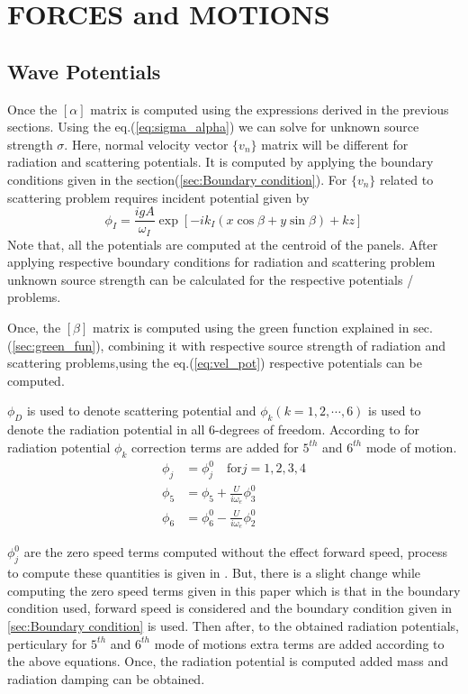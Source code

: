 \chapter{FORCES and MOTIONS}
\section{Wave Potentials}
Once the $[\alpha]$ matrix is computed using the expressions derived in the previous sections. Using
the eq.(\ref{eq:sigma_alpha}) we can solve for unknown source strength $\sigma$. Here, normal velocity
vector $\{v_n\}$ matrix will be different for radiation and scattering potentials. It is computed by applying 
the boundary conditions given in the section(\ref{sec:Boundary condition}). For $\{v_n\}$ related to
scattering problem requires incident potential given by 
\begin{equation}
    \label{eq:incident_pot}
    \phi_I = \frac{igA}{\omega_I} \exp[-ik_I(x\cos \beta + y\sin \beta)+kz]
\end{equation}
Note that, all the potentials are computed at the centroid of the panels. After applying respective 
boundary conditions for radiation and scattering problem unknown source strength can be calculated for the 
respective potentials / problems.

Once, the $[\beta]$ matrix is computed using the green function explained in sec.(\ref{sec:green_fun}), combining 
it with respective source strength of radiation and scattering problems,using the eq.(\ref{eq:vel_pot})
respective potentials can be computed.

$\phi_D$ is used to denote scattering potential and $\phi_k (k=1, 2, \cdots, 6)$ is used to denote the 
radiation potential in all 6-degrees of freedom. According to \cite{salvesen1970ship} for radiation potential $\phi_k$ 
correction terms are added for $5^{th}$ and $6^{th}$ mode of motion.
\begin{align}
    \phi_j &= \phi^0_j \quad \text{for} j = 1, 2, 3, 4 \\ \nonumber 
    \phi_5 &= \phi_5 +\frac{U}{i\omega_e} \phi^0_3 \\ \nonumber 
    \phi_6 &= \phi^0_6 - \frac{U}{i\omega_e} \phi^0_2
\end{align}

$\phi^0_j$ are the zero speed terms computed without the effect forward speed, process to 
compute these quantities is given in \cite{guha2012development}. But, there is a slight change while
computing the zero speed terms given in this paper which is that in the boundary condition used,
forward speed is considered and the boundary condition given in \ref{sec:Boundary condition} is used.
Then after, to the obtained radiation potentials, perticulary for $5^{th}$ and $6^{th}$ mode of motions 
extra terms are added according to the above equations. Once, the radiation potential is computed 
added mass and radiation damping can be obtained.
